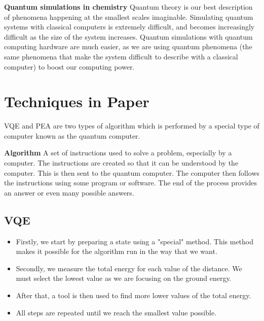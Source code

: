 \documentclass[14pt,landscape,color=UCLdarkred,margin=3cm]{uclposter}
\begin{document}
\begin{multicols}{3}
\begin{highlightbox}
\textbf{Quantum simulations in chemistry} Quantum theory is our best description of phenomena happening at the smallest scales imaginable. Simulating quantum systems with classical computers is extremely difficult, and becomes increasingly difficult as the size of the system increases. Quantum simulations with quantum computing hardware are much easier, as we are using quantum phenomena (the same phenomena that make the system difficult to describe with a classical computer) to boost our computing power.
\end{highlightbox}

\columnbreak

\section*{Techniques in Paper}


VQE and PEA are two types of algorithm which is performed by a special type of computer known as the quantum computer.

\begin{highlightbox}
\textbf{Algorithm} A set of instructions used to solve a problem, especially by a computer. The instructions are created so that it can be understood by the computer. This is then sent to the quantum computer. The computer then follows the instructions using some program or software. The end of the process provides an answer or even many possible answers.
\end{highlightbox}


\subsection*{VQE}
\begin{highlightbox}
  \begin{itemize}
\item Firstly, we start by preparing a state using a "special" method. This method makes it possible for the algorithm run in the way that we want.
\item Secondly, we measure the total energy for each value of the distance. We must select the lowest value as we are focusing on the ground energy.
\item After that, a tool is then used to find more lower values of the total energy.
\item All steps are repeated until we reach the smallest value possible.
\end{itemize}
\end{highlightbox}


\end{multicols}
\end{document}
